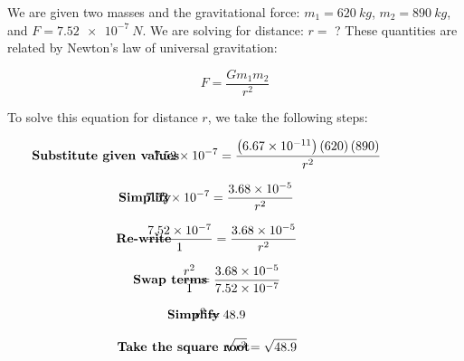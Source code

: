 \documentclass[dvipsnames]{article}
\numberwithin{equation}{section}
\numberwithin{figure}{section}
\begin{document}
\Solution We are given two masses and the gravitational force: $m_1 = \SI{620}{kg}$, $m_2 = \SI{890}{kg}$, and $F = \SI{7.52e-7}{N}$. We are solving for distance: $r=$ ? These quantities are related by Newton's law of universal gravitation:

\begin{equation*}
    F = \frac{G m_1 m_2}{r^2}
\end{equation*}

To solve this equation for distance $r$, we take the following steps:

\begin{align*}
    \hspace{-3.5em} & \textbf{Substitute given values} & \hspace{-3em} &
    \SI{7.52e-7}{} = \frac{
        \left(\SI{6.67e-11}{}\right)
        \left(620\right)
        \left(890\right)
    }{r^2}
\end{align*}

\begin{align*}
    \hspace{-3.5em} & \textbf{Simplify} & \hspace{-3em} &
    \SI{7.52e-7}{} = \frac{\SI{3.68e-5}{}}{r^2}
\end{align*}

\begin{align*}
    \hspace{-3.5em} & \textbf{Re-write} & \hspace{-3em} &
    \frac{\SI{7.52e-7}{}}{1} = \frac{\SI{3.68e-5}{}}{r^2}
\end{align*}

\begin{align*}
    \hspace{-3.5em} & \textbf{Swap terms} & \hspace{-3em} &
    \frac{r^2}{1} = \frac{\SI{3.68e-5}{}}{\SI{7.52e-7}{}}
\end{align*}


\begin{align*}
    \hspace{-3.5em} & \textbf{Simplify} & \hspace{-3em} &
    r^2 = 48.9
\end{align*}

\begin{align*}
    \hspace{-3.5em} & \textbf{Take the square root} & \hspace{-3em} &
    \sqrt{r^2} = \sqrt{48.9}
\end{align*}
\end{document}
